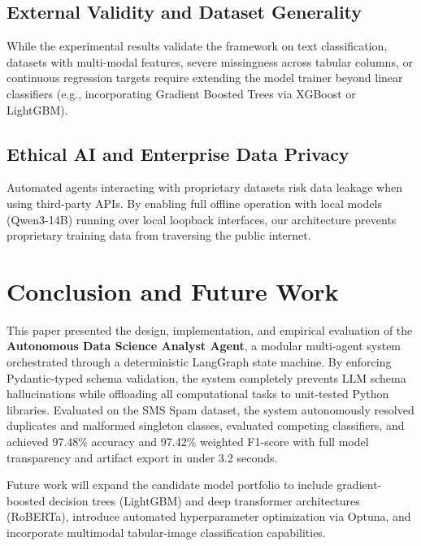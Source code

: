 \documentclass[conference]{IEEEtran}
\begin{document}
\subsection{External Validity and Dataset Generality}
While the experimental results validate the framework on text classification, datasets with multi-modal features, severe missingness across tabular columns, or continuous regression targets require extending the model trainer beyond linear classifiers (e.g., incorporating Gradient Boosted Trees via XGBoost or LightGBM).

\subsection{Ethical AI and Enterprise Data Privacy}
Automated agents interacting with proprietary datasets risk data leakage when using third-party APIs. By enabling full offline operation with local models (Qwen3-14B) running over local loopback interfaces, our architecture prevents proprietary training data from traversing the public internet.

\section{Conclusion and Future Work}
This paper presented the design, implementation, and empirical evaluation of the \textbf{Autonomous Data Science Analyst Agent}, a modular multi-agent system orchestrated through a deterministic LangGraph state machine. By enforcing Pydantic-typed schema validation, the system completely prevents LLM schema hallucinations while offloading all computational tasks to unit-tested Python libraries. Evaluated on the SMS Spam dataset, the system autonomously resolved duplicates and malformed singleton classes, evaluated competing classifiers, and achieved 97.48\% accuracy and 97.42\% weighted F1-score with full model transparency and artifact export in under 3.2 seconds.

Future work will expand the candidate model portfolio to include gradient-boosted decision trees (LightGBM) and deep transformer architectures (RoBERTa), introduce automated hyperparameter optimization via Optuna, and incorporate multimodal tabular-image classification capabilities.
\end{document}
